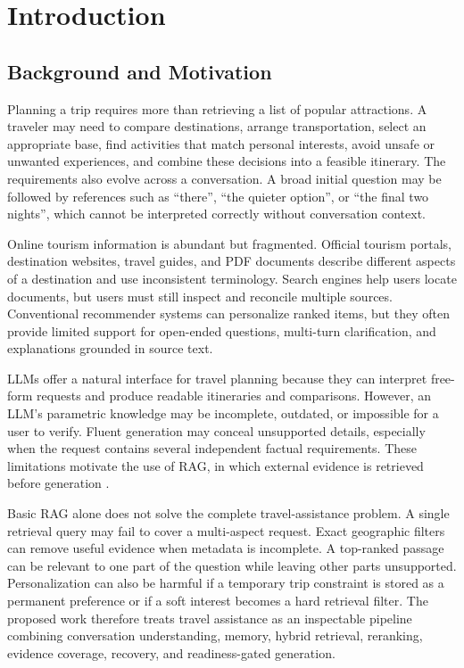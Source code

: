 \chapter{Introduction}
\label{chap:introduction}

\section{Background and Motivation}

Planning a trip requires more than retrieving a list of popular attractions. A
traveler may need to compare destinations, arrange transportation, select an
appropriate base, find activities that match personal interests, avoid unsafe
or unwanted experiences, and combine these decisions into a feasible itinerary.
The requirements also evolve across a conversation. A broad initial question
may be followed by references such as ``there'', ``the quieter option'', or
``the final two nights'', which cannot be interpreted correctly without
conversation context.

Online tourism information is abundant but fragmented. Official tourism
portals, destination websites, travel guides, and PDF documents describe
different aspects of a destination and use inconsistent terminology. Search
engines help users locate documents, but users must still inspect and reconcile
multiple sources. Conventional recommender systems can personalize ranked
items, but they often provide limited support for open-ended questions,
multi-turn clarification, and explanations grounded in source text.

LLMs offer a natural interface for travel planning because they can interpret
free-form requests and produce readable itineraries and comparisons. However,
an LLM's parametric knowledge may be incomplete, outdated, or impossible for a
user to verify. Fluent generation may conceal unsupported details, especially
when the request contains several independent factual requirements. These
limitations motivate the use of RAG, in which external evidence is retrieved
before generation \cite{lewis2020rag}.

Basic RAG alone does not solve the complete travel-assistance problem. A single
retrieval query may fail to cover a multi-aspect request. Exact geographic
filters can remove useful evidence when metadata is incomplete. A top-ranked
passage can be relevant to one part of the question while leaving other parts
unsupported. Personalization can also be harmful if a temporary trip constraint
is stored as a permanent preference or if a soft interest becomes a hard
retrieval filter. The proposed work therefore treats travel assistance as an
inspectable pipeline combining conversation understanding, memory, hybrid
retrieval, reranking, evidence coverage, recovery, and readiness-gated
generation.

